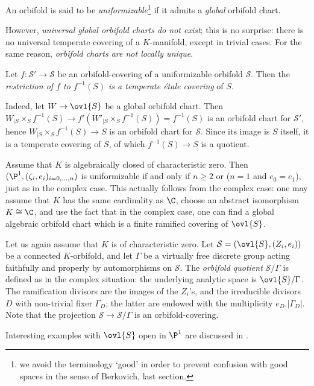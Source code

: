 \begin{para}\label{para::4.4.4} An orbifold is said to be {\it
 uniformizable}\footnote{we avoid the terminology `good' in 
 order to prevent confusion with good spaces in the sense of Berkovich,
 \cf last section.} if it admits a {\it global} orbifold chart.
 
 However, {\it universal global orbifold charts do not exist}; this is
 no surprise: there is no universal temperate covering of a
 $K$-manifold, except in trivial cases. For the same reason, {\it
 orbifold charts are not locally unique}.
 
 \medskip Let $f:\mathcal{S}'\to \mathcal{S}$ be an orbifold-covering of a
 uniformizable orbifold $\mathcal{S}$. Then the {\it restriction of $f$ to
 $f^{-1}(S)$ is a temperate \'etale covering} of $S$.

 Indeed, let $W\to \ovl{S}$ be a global orbifold chart. Then
 $W_{|S}\times_S f^{-1}(S)\to f'(W'_{|S}\times_S f^{-1}(S))= f^{-1}(S)$
 is an orbifold chart for $\mathcal{S}'$, hence $W_{| S}\times_S
 f^{-1}(S)\to S$ is an orbifold chart for $\mathcal{S}$. Since its image is
 $S$ itself, it is a temperate covering of $S$, of which $f^{-1}(S)\to S$ is 
 a quotient.

\medskip{} Assume that $K$ is algebraically closed
of characteristic zero. Then $(\P^1, (\zeta_i, e_i)_{i=0,\ldots, n})$
is uniformizable if and only if $n\geq 2$ or ($n=1$ and $e_0=e_1$),
just as in the complex case. This actually follows from the complex
 case: one may assume that $K$ has the same cardinality as $\C$, choose
 an abstract isomorphism $K\cong \C$, and use the fact that in the
 complex case, one can find a global algebraic orbifold chart which is a
 finite ramified covering of $\ovl{S}$.
\end{para}

\begin{para}\label{para::4.4.5} Let us again assume that $K$ is of
 characteristic zero. Let $\mathcal{S}=(\ovl{S}, (Z_i,e_i))$ be a
 connected $K$-orbifold, and let $\Gamma$ be a virtually free discrete group acting
 faithfully and properly by automorphisms on $\mathcal{S}$.  The {\it
 orbifold quotient} $\mathcal{S}/\Gamma$ is defined as in the complex
 situation: the underlying analytic space is $\ovl{S}/\Gamma$. The
 ramification divisors are the images of the $Z_i$'s, and the
 irreducible divisors $D$ with non-trivial fixer $\Gamma_D$; the latter
 are endowed with the multiplicity $e_D.| \Gamma_D|$.
 Note that the projection $\mathcal{S}\to \mathcal{S}/\Gamma$ is an
 orbifold-covering.

 Interesting examples with $\ovl{S}$ open in $\P^1$ are discussed in
 \cite{van92:_discr_mumfor}. 
\end{para}

